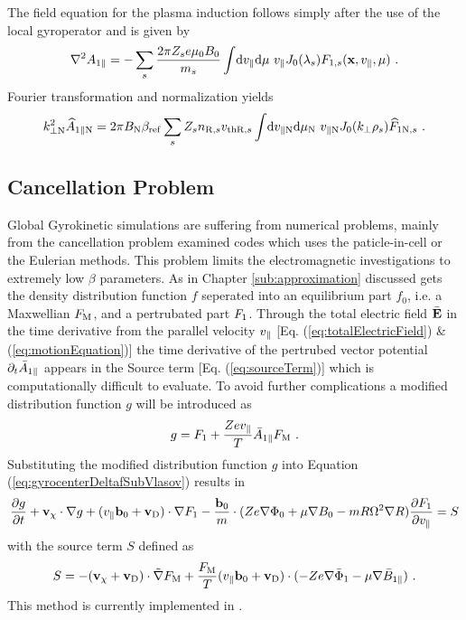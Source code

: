 The field equation for the plasma induction follows simply after the use of the local gyroperator and is given by
\begin{gather}
	\nabla^2 A_{1\parallel} = - \sum_s \frac{2\pi Z_se \mu_0 B_0}{m_s}  \int \! \mathrm{d}v_\parallel\mathrm{d}\mu ~ v_\parallel J_0(\lambda_s) F_{1,s}(\boldsymbol{\mathbf{x}}, v_\parallel, \mu)~.
	\label{eq:fieldInductionLocal}
\end{gather}
Fourier transformation and normalization yields
\begin{gather}
	k_{\perp \mathrm{N}}^2 \widehat{A}_{1\parallel \mathrm{N}} = 2 \pi B_\mathrm{N} \beta_\mathrm{ref}\sum_s Z_s n_{\mathrm{R},s} v_{\mathrm{th}\mathrm{R},s} \int \! \mathrm{d}v_{\parallel \mathrm{N}}\mathrm{d}\mu_\mathrm{N} ~ v_{\parallel \mathrm{N}} J_0(k_\perp \rho_s) \widehat{F}_{1\mathrm{N},s}~.
	\label{eq:fieldInductionLocalNorm}
\end{gather}
\newpage

\subsection{Cancellation Problem}
\label{sub:cancelProblem}

Global Gyrokinetic simulations are suffering from numerical problems, mainly from the cancellation problem \cite{Chen2001} examined codes \cite{Cummings_PHD} which uses the paticle-in-cell or the Eulerian methods. This problem limits the electromagnetic investigations to extremely low $\beta$ parameters. \cite{Naitou1995} As in Chapter \ref{sub:approximation} discussed gets the density distribution function $f$ seperated into an equilibrium part $f_0$, i.e. a Maxwellian $F_\mathrm{M}$, and a pertrubated part $F_1$. Through the total electric field $\bar{\boldsymbol{\mathbf{E}}}$ in the time derivative from the parallel velocity $v_\parallel$ [Eq. (\ref{eq:totalElectricField}) \& (\ref{eq:motionEquation})] the time derivative of the pertrubed vector potential $\partial_t \bar{A}_{1\parallel}$ appears in the Source term [Eq. (\ref{eq:sourceTerm})] which is computationally difficult to evaluate. To avoid further complications a modified distribution function $g$ will be introduced as
\begin{gather}
	g = F_1 + \frac{Ze v_\parallel}{T} \bar{A}_{1\parallel} F_\mathrm{M} ~.
	\label{eq:modifiedDistrubutionFunction}
\end{gather}
Substituting the modified distribution function $g$ into Equation (\ref{eq:gyrocenterDeltafSubVlasov}) results in
\begin{gather}
	\frac{\partial g}{\partial t} + \boldsymbol{\mathbf{v}}_\chi \cdot \nabla g + (v_\parallel \boldsymbol{\mathbf{b}}_0 + \boldsymbol{\mathbf{v}}_\mathrm{D}) \cdot \nabla F_1 - \frac{\boldsymbol{\mathbf{b}}_0}{m} \cdot (Z e \nabla \Phi_0 + \mu \nabla B_0 - m R \Omega^2 \nabla R) \frac{\partial F_1}{\partial v_\parallel} = S
	\label{eq:modifiedGyrocenterDeltafSubVlasov}
\end{gather}
with the source term $S$ defined as
\begin{gather}
	S = - (\boldsymbol{\mathbf{v}}_\chi + \boldsymbol{\mathbf{v}}_\mathrm{D}) \cdot \tilde{\nabla} F_\mathrm{M} + \frac{F_\mathrm{M}}{T} (v_\parallel \boldsymbol{\mathbf{b}}_0 + \boldsymbol{\mathbf{v}}_\mathrm{D}) \cdot (-Ze \nabla \bar{\Phi}_1 - \mu \nabla \bar{B}_{1\parallel}) ~.
	\label{eq:modifiedSourceTerm}
\end{gather}
This method is currently implemented in \gkw\cite{Peeters2009A}.
\newpage

